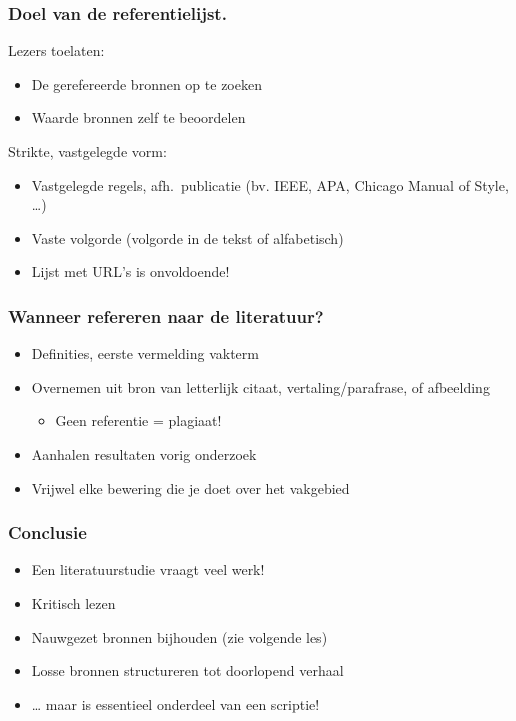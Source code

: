\documentclass[aspectratio=169]{beamer}
\begin{document}
\begin{frame}[plain]
  \frametitle{Doel van de referentielijst.}

  Lezers toelaten:

  \begin{itemize}
    \item De gerefereerde bronnen op te zoeken
    \item Waarde bronnen zelf te beoordelen
  \end{itemize}

  {\pause}

  Strikte, vastgelegde vorm:

  \begin{itemize}
    \item Vastgelegde regels, afh.~publicatie (bv. IEEE, APA, Chicago Manual of Style, \ldots)
    \item Vaste volgorde (volgorde in de tekst of alfabetisch)
    \item Lijst met URL's is onvoldoende!
  \end{itemize}

  {\pause}

\end{frame}

\begin{frame}
  \frametitle{Wanneer refereren naar de literatuur?}

  \begin{itemize}
    \item Definities, eerste vermelding vakterm
    \item Overnemen uit bron van letterlijk citaat, vertaling/parafrase, of afbeelding
          \begin{itemize}
            \item Geen referentie = \alert{plagiaat!}
          \end{itemize}
    \item Aanhalen resultaten vorig onderzoek
    \item Vrijwel elke bewering die je doet over het vakgebied
  \end{itemize}

  \bigskip

\end{frame}

\begin{frame}
  \frametitle{Conclusie}

  \begin{itemize}
    \item Een literatuurstudie vraagt veel werk!
    \item Kritisch lezen
    \item Nauwgezet bronnen bijhouden (zie volgende les)
    \item Losse bronnen structureren tot doorlopend verhaal
    \item \ldots{} maar is essentieel onderdeel van een scriptie!
  \end{itemize}

\end{frame}
\end{document}
